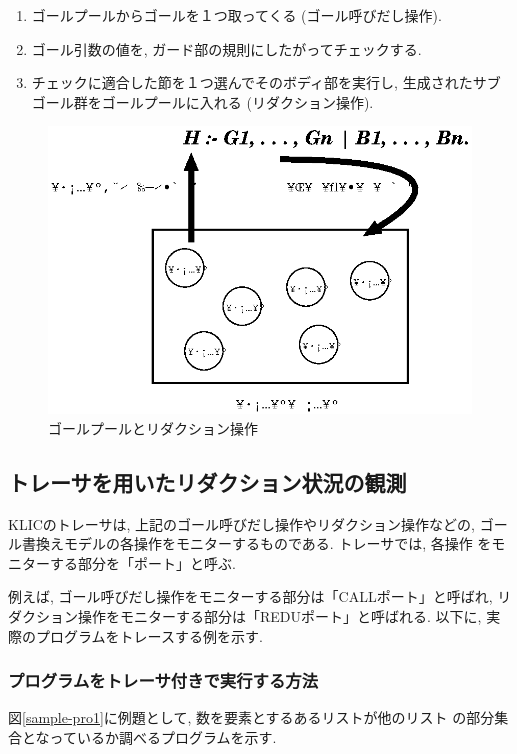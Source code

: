 \documentclass[a4,titlepage]{jsreport}
\begin{document}
\begin{enumerate}
\item ゴールプールからゴールを１つ取ってくる (ゴール呼びだし操作).
\item ゴール引数の値を, ガード部の規則にしたがってチェックする.  
\item チェックに適合した節を１つ選んでそのボディ部を実行し, 生成されたサブゴール群をゴールプールに入れる (リダクション操作).
\end{enumerate}

\begin{figure}[htb]
\begin{center}
\includegraphics[width=.6\textwidth]{fig/goalpool.eps}
\caption{ゴールプールとリダクション操作}
\label{goalpool}
\end{center}
\end{figure}

\subsection{トレーサを用いたリダクション状況の観測}

KLICのトレーサは, 上記のゴール呼びだし操作やリダクション操作などの, ゴー
ル書換えモデルの各操作をモニターするものである.  トレーサでは, 各操作
をモニターする部分を「ポート」と呼ぶ.

例えば, ゴール呼びだし操作をモニターする部分は「CALLポート」と呼ばれ, 
リダクション操作をモニターする部分は「REDUポート」と呼ばれる.  以下に, 
実際のプログラムをトレースする例を示す.

\subsubsection{プログラムをトレーサ付きで実行する方法}

図\ref{sample-pro1}に例題として, 数を要素とするあるリストが他のリスト
の部分集合となっているか調べるプログラムを示す.   
\end{document}

